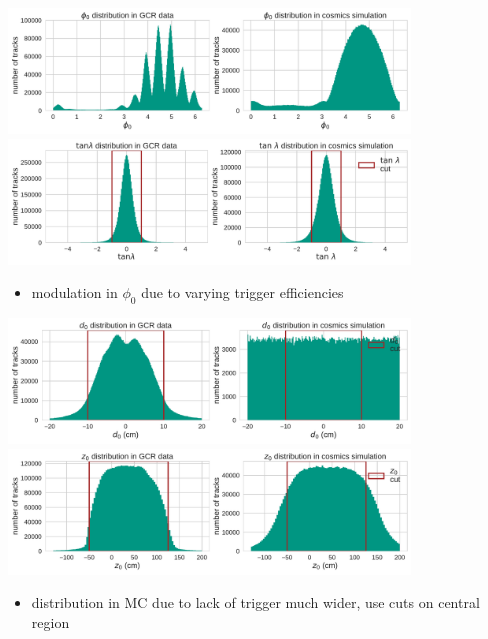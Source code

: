 \documentclass[18pt]{beamer}
\begin{document}
  \begin{frame}
    \begin{center}
      \includegraphics[width=0.8\textwidth]{figures/distributions/gcr_phi0_distribution_uncut.pdf}\\
      \includegraphics[width=0.8\textwidth]{figures/distributions/gcr_tan_lambda_distribution_uncut.pdf}
    \end{center}

    \begin{itemize}
    \item modulation in $\phi_0$ due to varying trigger efficiencies
    \end{itemize}
  \end{frame}

  \begin{frame}
    \begin{center}
      \includegraphics[width=0.8\textwidth]{figures/distributions/gcr_d0_distribution_uncut.pdf}\\
      \includegraphics[width=0.8\textwidth]{figures/distributions/gcr_z0_distribution_uncut.pdf}
    \end{center}
    \begin{itemize}
    \item distribution in MC due to lack of trigger much wider, use cuts on central region
    \end{itemize}
  \end{frame}
\end{document}
